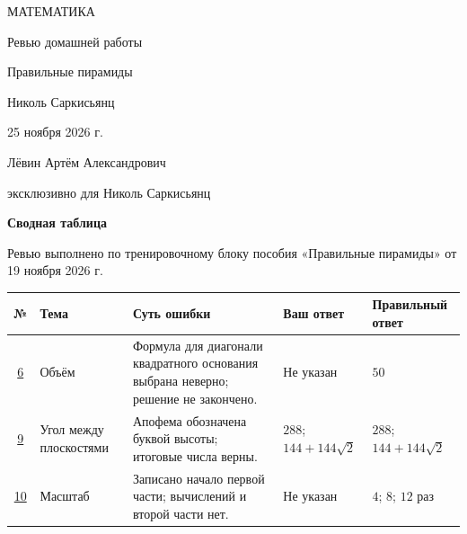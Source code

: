 \documentclass[a4paper,12pt]{article}
\begin{document}
\begin{titlepage}
\centering
\vspace*{0.20\textheight}
{\Large\color{darkaccent} МАТЕМАТИКА\par}
\vspace{15mm}
{\LARGE Ревью домашней работы\par}
\vspace{10mm}
{\Large\color{accent} Правильные пирамиды\par}
\vfill
{\large Николь Саркисьянц\par}
\vspace{9mm}25 ноября 2026 г.\par
\vspace{14mm}\small Лёвин Артём Александрович\par эксклюзивно для Николь Саркисьянц\par
\vspace{15mm}
\end{titlepage}
\setcounter{page}{1}
{\Large\color{darkaccent}\bfseries Сводная таблица}\par\medskip
Ревью выполнено по тренировочному блоку пособия «Правильные пирамиды» от 19 ноября 2026 г.\par\medskip
\renewcommand{\arraystretch}{1.4}
\small
\begin{tabularx}{\linewidth}{@{}c >{\raggedright\arraybackslash}p{26mm} >{\raggedright\arraybackslash}X >{\raggedright\arraybackslash}p{31mm} >{\raggedright\arraybackslash}p{32mm}@{}}
\toprule
№ & Тема & Суть ошибки & Ваш ответ & Правильный ответ\\
\midrule
\hyperref[task:6]{6} & Объём & Формула для диагонали квадратного основания выбрана неверно; решение не закончено. & Не указан & $50$\\
\hyperref[task:9]{9} & Угол между плоскостями & Апофема обозначена буквой высоты; итоговые числа верны. &  $288$;\newline $144+144\sqrt2$ & $288$;\newline $144+144\sqrt2$\\
\hyperref[task:10]{10} & Масштаб & Записано начало первой части; вычислений и второй части нет. & Не указан & $4$; $8$; $12$ раз\\
\bottomrule
\end{tabularx}
\normalsize
\end{document}
